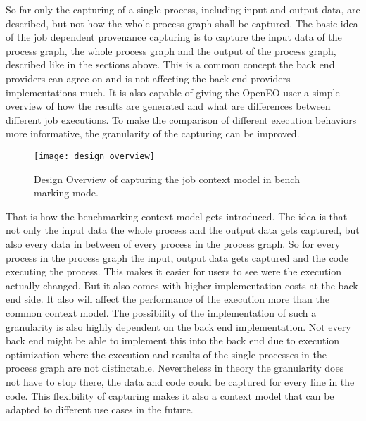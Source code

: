 \documentclass[draft,final]{vutinfth} %
\begin{document}
So far only the capturing of a single process, including input and output data, are described, but not how the whole process graph shall be captured. The basic idea of the job dependent provenance capturing is to capture the input data of the process graph, the whole process graph and the output of the process graph, described like in the sections above. This is a common concept the back end providers can agree on and is not affecting the back end providers implementations much. It is also capable of giving the OpenEO user a simple overview of how the results are generated and what are differences between different job executions. 
To make the comparison of different execution behaviors more informative, the granularity of the capturing can be improved. 

\begin{figure}[h]
	\centering
	\texttt{[image: design\_overview]}
	\caption{Design Overview of capturing the job context model in bench marking mode.}
	\label{fig:design_overview} %
\end{figure}
That is how the benchmarking context model gets introduced. The idea is that not only the input data the whole process and the output data gets captured, but also every data in between of every process in the process graph. So for every process in the process graph the input, output data gets captured and the code executing the process. This makes it easier for users to see were the execution actually changed. But it also comes with higher implementation costs at the back end side. It also will affect the performance of the execution more than the common context model. The possibility of the implementation of such a granularity is also highly dependent on the back end implementation. Not every back end might be able to implement this into the back end due to execution optimization where the execution and results of the single  processes in the process graph are not distinctable. Nevertheless in theory the granularity does not have to stop there, the data and code could be captured for every line in the code. This flexibility of capturing makes it also a context model that  can be adapted to different use cases in the future.  
\end{document}
